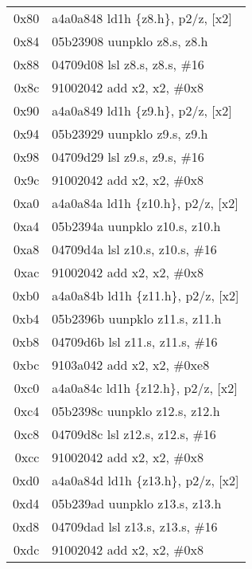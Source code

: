 \documentclass[11pt,a4paper]{article}
\begin{document}
\begin{longtable}{|r|l|}
\rowcolor{matrixload} 0x80 & a4a0a848 \quad ld1h \{z8.h\}, p2/z, [x2] \\
\rowcolor{conversion} 0x84 & 05b23908 \quad uunpklo z8.s, z8.h \\
\rowcolor{conversion} 0x88 & 04709d08 \quad lsl z8.s, z8.s, \#16 \\
\rowcolor{address} 0x8c & 91002042 \quad add x2, x2, \#0x8 \\
\rowcolor{matrixload} 0x90 & a4a0a849 \quad ld1h \{z9.h\}, p2/z, [x2] \\
\rowcolor{conversion} 0x94 & 05b23929 \quad uunpklo z9.s, z9.h \\
\rowcolor{conversion} 0x98 & 04709d29 \quad lsl z9.s, z9.s, \#16 \\
\rowcolor{address} 0x9c & 91002042 \quad add x2, x2, \#0x8 \\
\rowcolor{matrixload} 0xa0 & a4a0a84a \quad ld1h \{z10.h\}, p2/z, [x2] \\
\rowcolor{conversion} 0xa4 & 05b2394a \quad uunpklo z10.s, z10.h \\
\rowcolor{conversion} 0xa8 & 04709d4a \quad lsl z10.s, z10.s, \#16 \\
\rowcolor{address} 0xac & 91002042 \quad add x2, x2, \#0x8 \\
\rowcolor{matrixload} 0xb0 & a4a0a84b \quad ld1h \{z11.h\}, p2/z, [x2] \\
\rowcolor{conversion} 0xb4 & 05b2396b \quad uunpklo z11.s, z11.h \\
\rowcolor{conversion} 0xb8 & 04709d6b \quad lsl z11.s, z11.s, \#16 \\
\rowcolor{address} 0xbc & 9103a042 \quad add x2, x2, \#0xe8 \\
\rowcolor{matrixload} 0xc0 & a4a0a84c \quad ld1h \{z12.h\}, p2/z, [x2] \\
\rowcolor{conversion} 0xc4 & 05b2398c \quad uunpklo z12.s, z12.h \\
\rowcolor{conversion} 0xc8 & 04709d8c \quad lsl z12.s, z12.s, \#16 \\
\rowcolor{address} 0xcc & 91002042 \quad add x2, x2, \#0x8 \\
\rowcolor{matrixload} 0xd0 & a4a0a84d \quad ld1h \{z13.h\}, p2/z, [x2] \\
\rowcolor{conversion} 0xd4 & 05b239ad \quad uunpklo z13.s, z13.h \\
\rowcolor{conversion} 0xd8 & 04709dad \quad lsl z13.s, z13.s, \#16 \\
\rowcolor{address} 0xdc & 91002042 \quad add x2, x2, \#0x8 \\

\end{longtable}
\end{document}
